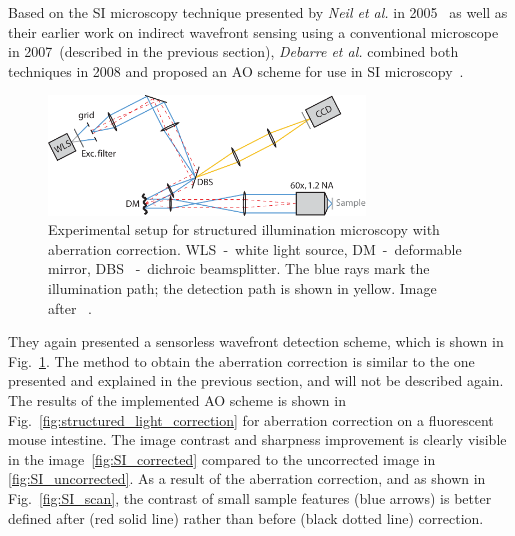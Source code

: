 Based on the SI microscopy technique presented by \emph{Neil et al.} in 2005~\cite{wide_structured_illu_principle} as well as their earlier work on indirect wavefront sensing using a conventional microscope~\cite{wide_AOM_loew_freq} in 2007~(described in the previous section), \emph{Debarre et al.} combined both techniques in 2008 and proposed an AO scheme for use in SI microscopy~\cite{wide_AOM_structured_illu}.  

\begin{figure}[hbt]
	\centering
		\includegraphics[width=0.75\textwidth]{images/wide_structured_illumination.pdf}
	\caption{Experimental setup for structured illumination microscopy with 
aberration correction. WLS~-~white light source, DM~-~deformable mirror, DBS
~-~dichroic beamsplitter. The blue rays mark the illumination path; the 
detection path is shown in yellow. Image after~\cite{wide_AOM_structured_illu}
.}
	\label{fig:wide_structured_illumination}
\end{figure}

They again presented a sensorless wavefront detection scheme, which is shown in Fig.~\ref{fig:wide_structured_illumination}. The method to obtain the aberration correction is similar to the one presented and explained in the previous section, and will not be described again. The results of the implemented AO scheme is shown in Fig.~\ref{fig:structured_light_correction} for aberration correction on a fluorescent mouse intestine. The image contrast and sharpness improvement is clearly visible in the image~\ref{fig:SI_corrected} compared to the uncorrected image in \ref{fig:SI_uncorrected}. As a result of the aberration correction, and as shown in Fig.~\ref{fig:SI_scan}, the contrast of small sample features (blue arrows) is better defined after (red solid line) rather than before (black dotted line) correction. 

